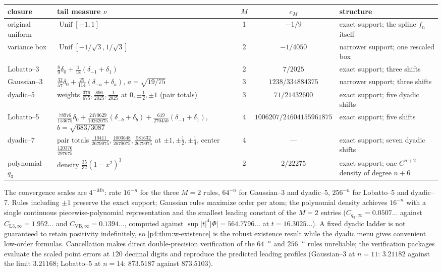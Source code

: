 \documentclass[11pt,oneside]{article}
\numberwithin{equation}{section}
\theoremstyle{definition}
\theoremstyle{remark}
\begin{document}
\begin{center}
\small
\begin{tabularx}{\textwidth}{@{}l >{\raggedright\arraybackslash}p{} c c >{\raggedright\arraybackslash}X@{}}
\toprule
closure & tail measure $\nu$ & $M$ & $c_M$ & structure\\
\midrule
original uniform & $\operatorname{Unif}[-1,1]$ & 1 & $-1/9$
 & exact support; the spline $f_n$ itself\\
variance box & $\operatorname{Unif}[-1/\sqrt3,1/\sqrt3]$ & 2 & $-1/4050$
 & narrower support; one rescaled box\\
Lobatto--3 & $\tfrac89\delta_0+\tfrac1{18}(\delta_{-1}+\delta_1)$ & 2
 & $7/2025$ & exact support; three shifts\\
Gaussian--3 & $\tfrac{32}{57}\delta_0+\tfrac{25}{114}(\delta_{-a}+\delta_a)$,
 $a=\sqrt{19/75}$ & 3 & $1238/334884375$
 & narrower support; three shifts\\
dyadic--5 & weights $\tfrac{376}{675},\tfrac{896}{2025},\tfrac1{2025}$ at
 $0,\pm\tfrac12,\pm1$ (pair totals) & 3 & $71/21432600$
 & exact support; five dyadic shifts\\
Lobatto--5 & $\tfrac{78976}{153675}\delta_0
 +\tfrac{2470629}{10262075}(\delta_{-b}+\delta_b)
 +\tfrac{619}{270450}(\delta_{-1}+\delta_1)$, $b=\sqrt{683/3087}$ & 4
 & $1006207/24604155961875$ & exact support; five shifts\\
dyadic--7 & pair totals $\tfrac{10411}{2679075},
 \tfrac{1003648}{2679075},\tfrac{581632}{2679075}$ at $\pm1,\pm\tfrac12,
 \pm\tfrac14$, center $\tfrac{120376}{297675}$ & 4 & ---
 & exact support; seven dyadic shifts\\
polynomial $q_3$ & density $\tfrac{35}{32}(1-x^2)^3$ & 2 & $2/22275$
 & exact support; one $C^{n+2}$ density of degree $n+6$\\
\bottomrule
\end{tabularx}
\end{center}

The convergence scales are $4^{-Mn}$: rate $16^{-n}$ for the three
$M=2$ rules, $64^{-n}$ for Gaussian--3 and dyadic--5, $256^{-n}$ for
Lobatto--5 and dyadic--7.  Rules including $\pm1$ preserve the exact
support; Gaussian rules maximize order per atom; the polynomial density
achieves $16^{-n}$ with a single continuous piecewise-polynomial
representation and the smallest leading constant of the $M=2$ entries
($C_{q_3,\infty}=0.0507\ldots$ against $C_{\mathrm{L3},\infty}=1.952\ldots$
and $C_{\mathrm{VB},\infty}=0.1394\ldots$, computed against
$\sup|t|^{4}|\Phi|=564.7796\ldots$ at $t=16.3025\ldots$).  A fixed dyadic
ladder is not guaranteed to retain positivity indefinitely, so
\cref{p4:thm:w-existence} is the robust existence result while the dyadic
menu gives convenient low-order formulas.  Cancellation makes direct
double-precision verification of the $64^{-n}$ and $256^{-n}$ rules
unreliable; the verification packages evaluate the scaled point errors at
$120$ decimal digits and reproduce the predicted leading profiles
(Gaussian--3 at $n=11$: $3.21182$ against the limit $3.21168$;
Lobatto--5 at $n=14$: $873.5187$ against $873.5103$).
\end{document}
